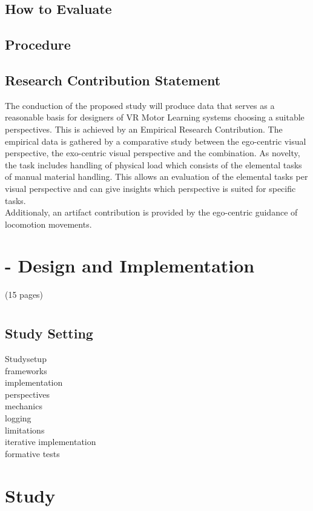 \subsection{How to Evaluate}
\subsection{Procedure}
\subsection{Research Contribution Statement}
\label{delimination_contribution}
The conduction of the proposed study will produce data that serves as a reasonable basis for designers of VR Motor Learning systems choosing a suitable perspectives. This is achieved by an Empirical Research Contribution. The empirical data is gathered by a comparative study between the ego-centric visual perspective, the exo-centric visual perspective and the combination. As novelty, the task includes handling of physical load which consists of the elemental tasks of manual material handling. This allows an evaluation of the elemental tasks per visual perspective and can give insights which perspective is suited for specific tasks.\\
Additionaly, an artifact contribution is provided by the ego-centric guidance of locomotion movements.
\section{\exgo - Design and Implementation}
(15 pages)
\section{\exgo}
\label{section:system}
\subsection{Study Setting}
Studysetup\\
frameworks\\
implementation\\
perspectives\\
mechanics\\
logging\\
limitations\\
iterative implementation\\
formative tests\\
\section{Study}
\label{section:study}

